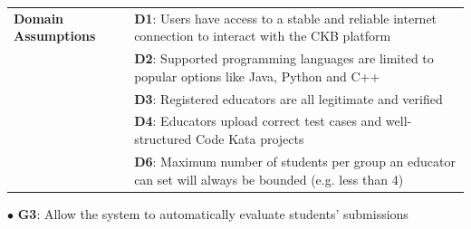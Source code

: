 \begin{center}
\begin{tabular}{ |m{3cm}|m{10cm}| }
        \hline
        \textbf{Domain \newline Assumptions} 
        & \textbf{D1}: Users have access to a stable and reliable internet connection to interact with the CKB platform \\
        & \textbf{D2}: Supported programming languages are limited to popular options like Java, Python and C++ \\
        & \textbf{D3}: Registered educators are all legitimate and verified \\
        & \textbf{D4}: Educators upload correct test cases and well-structured Code Kata projects \\
        & \textbf{D6}: Maximum number of students per group an educator can set will always be bounded (e.g. less than 4) \\
        \hline
    \end{tabular}
\end{center}        
$\bullet$ \textbf{G3}: Allow the system to automatically evaluate students' submissions
